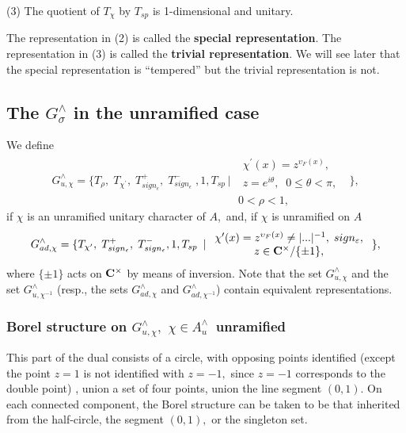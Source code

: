 (3) The quotient of $T_\chi $ by $T_{sp}$ is 1-dimensional and unitary.

The representation in (2) is called the {\bf special representation}. The
representation in (3) is called the {\bf trivial representation}. We will
see later that the special representation is ``tempered'' but the trivial
representation is not.

\subsection{The $G_\sigma ^{\wedge }$ in the unramified case}

We define 
\[
G_{u,\chi }^{\wedge }=\{T_\rho ,\;T_{\chi ^{\prime }},\;T_{sign_\epsilon
}^{+},\;T_{sign_\epsilon }^{-}\;,1,T_{sp\;}|\; 
\begin{array}{c}
\begin{array}{c}
\chi ^{\prime }(x)=z^{\upsilon _F(x)},\; \\ 
z=e^{i\theta },\;\;0\leq \theta <\pi ,
\end{array}
\\ 
0<\rho <1,
\end{array}
\;\}, 
\]
if $\chi $ is an unramified unitary character of $A$,\ and, if $\chi $ is
unramified on $A$ 
\[
G_{ad,\chi }^{\wedge }=\{T_{\chi ^{\prime }},\;T_{sign_\epsilon
}^{+},\;T_{sign_\epsilon }^{-},1,T_{sp\;}\;|\; 
\begin{array}{c}
\chi ^{\prime }(x)=z^{\upsilon _F(x)}\neq |...|^{-1},\;sign_\varepsilon , \\ 
z\in {\bf C}^{\times }/\{\pm 1\},
\end{array}
\;\}, 
\]
where $\{\pm 1\}$ acts on ${\bf C}^{\times }$ by means of inversion. Note
that the set $G_{u,\chi }^{\wedge }$ and the set $G_{u,\chi ^{-1}}^{\wedge }$
(resp., the sets $G_{ad,\chi }^{\wedge }$ and $G_{ad,\chi ^{-1}}^{\wedge }$)
contain equivalent representations.

\subsubsection{Borel structure on $G_{u,\chi }^{\wedge },$ $\chi \in
A_u^{\wedge }$\ unramified}

This part of the dual consists of a circle, with opposing points identified
(except the point $z=1$ is not identified with $z=-1,$ since $z=-1$
corresponds to the double point) , union a set of four points, union the
line segment $(0,1)$. On each connected component, the Borel structure can
be taken to be that inherited from the half-circle, the segment $(0,1),$ or
the singleton set.

